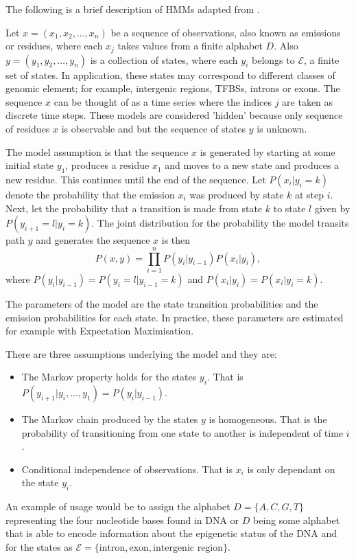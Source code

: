 The following is a brief description of HMMs adapted from \cite{mesa2016hidden}. 

Let $x = (x_1,x_2,\ldots,x_n)$ be a sequence of observations, also known as emissions or residues, where each $x_j$ takes values from a finite alphabet $D$. 
Also $y = (y_1,y_2,\ldots,y_n)$ is a collection of states, where each $y_i$ belongs to $\mathcal{E}$, a finite set of states. In application, these states may correspond to different classes of genomic element; for example, intergenic regions, TFBSs, introns or exons. The sequence $x$ can be thought of as a time series where the indices $j$ are taken as discrete time steps. These models are considered 'hidden' because only sequence of residues $x$ is observable and but the sequence of states $y$ is unknown.
 
The model assumption is that the sequence $x$ is generated by starting at some initial state $y_1$, produces a residue $x_1$ and moves to a new state and produces a new residue. This continues until the end of the sequence. Let $P(x_i|y_i = k)$ denote the probability that the emission $x_i$ was produced by state $k$ at step $i$. Next, let the probability that a transition is made from state $k$ to state $l$ given by $P(y_{i+1} = l | y_i = k)$. The joint distribution for the probability the model transits path $y$ and generates the sequence $x$ is then
	\begin{equation}
		P(x,y) = \prod_{i=1}^{n} P(y_i|y_{i-1})P(x_i|y_i),
	\end{equation}
where $P(y_i|y_{i-1}) = P(y_{i} = l | y_{i-1} = k)$ and $P(x_i|y_i) = P(x_i|y_i = k)$. 

The parameters of the model are the state transition probabilities and the emission probabilities for each state. In practice, these parameters are estimated for example with Expectation Maximisation.

There are three assumptions underlying the model and they are:
	\begin{itemize}
		\item The Markov property holds for the states $y_i$. That is $P(y_{i+1}|y_i,\ldots,y_1) = P(y_i|y_{i-1})$.
		\item The Markov chain produced by the states $y$ is homogeneous. That is the probability of transitioning from one state to another is independent of time $i$. 
		\item Conditional independence of observations. That is $x_i$ is only dependant on the state $y_i$. 
	\end{itemize}

An example of usage would be to assign the alphabet $D = \{A,C,G,T\}$ representing the four nucleotide bases found in DNA or $D$ being some alphabet that is able to encode information about the epigenetic status of the DNA and for the states as $\mathcal{E} = \{\text{intron}, \text{exon}, \text{intergenic region}\}$. 






